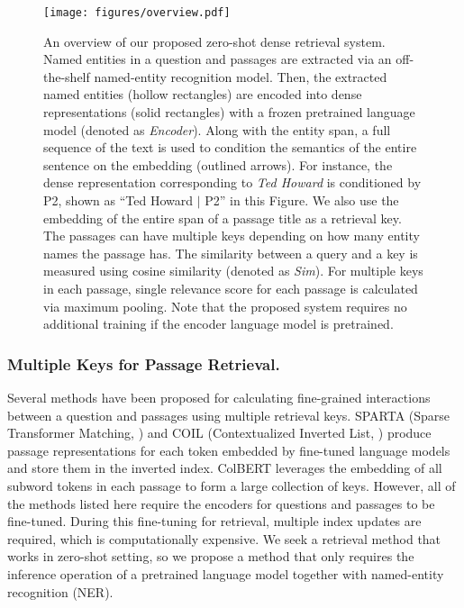 \documentclass[letterpaper]{article} \usepackage{aaai23}  \usepackage{times}  \usepackage{helvet}  \usepackage{courier}  \usepackage[hyphens]{url}  \usepackage{graphicx} \urlstyle{rm} \def\UrlFont{\rm}  \usepackage{natbib}  \usepackage{caption} \frenchspacing  \setlength{\pdfpagewidth}{8.5in}  \setlength{\pdfpageheight}{11in}  \usepackage{algorithm}
\begin{document}
\begin{figure*}[t]
	\centering
	\texttt{[image: figures/overview.pdf]}
	\caption{
		An overview of our proposed zero-shot dense retrieval system.
		Named entities in a question and passages are extracted via an off-the-shelf named-entity recognition model.
		Then, the extracted named entities (hollow rectangles) are encoded into dense representations (solid rectangles) with a frozen pretrained language model (denoted as \textit{Encoder}).
		Along with the entity span, a full sequence of the text is used to condition the semantics of the entire sentence on the embedding (outlined arrows).
		For instance, the dense representation corresponding to \textit{Ted Howard} is conditioned by P2, shown as ``Ted Howard $\mid$ P2'' in this Figure.
		We also use the embedding of the entire span of a passage title as a retrieval key.
		The passages can have multiple keys depending on how many entity names the passage has.
		The similarity between a query and a key is measured using cosine similarity (denoted as \textit{Sim}).
		For multiple keys in each passage, single relevance score for each passage is calculated via maximum pooling.
		Note that the proposed system requires no additional training if the encoder language model is pretrained.
	}
	\label{fig:overview}
\end{figure*}


\subsubsection{Multiple Keys for Passage Retrieval.}
Several methods have been proposed for calculating fine-grained interactions between a question and passages using multiple retrieval keys.
SPARTA (Sparse Transformer Matching, \citep{zhao-etal-2021-sparta}) and COIL (Contextualized Inverted List, \citep{gao-etal-2021-coil}) produce passage representations for each token embedded by fine-tuned language models and store them in the inverted index.
ColBERT \citep{khattab-etal-2021-relevance} leverages the embedding of all subword tokens in each passage to form a large collection of keys.
However, all of the methods listed here require the encoders for questions and passages to be fine-tuned.
During this fine-tuning for retrieval, multiple index updates are required, which is computationally expensive.
We seek a retrieval method that works in zero-shot setting, so we propose a method that only requires the inference operation of a pretrained language model together with named-entity recognition (NER).
\end{document}
